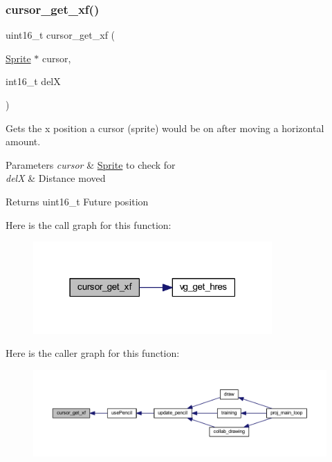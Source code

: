 \subsubsection{\texorpdfstring{cursor\+\_\+get\+\_\+xf()}{cursor\_get\_xf()}}
{\footnotesize\ttfamily uint16\+\_\+t cursor\+\_\+get\+\_\+xf (\begin{DoxyParamCaption}\item[{\mbox{\hyperlink{struct_sprite}{Sprite}} $\ast$}]{cursor,  }\item[{int16\+\_\+t}]{delX }\end{DoxyParamCaption})}



Gets the x position a cursor (sprite) would be on after moving a horizontal amount. 


\begin{DoxyParams}{Parameters}
{\em cursor} & \mbox{\hyperlink{struct_sprite}{Sprite}} to check for \\
\hline
{\em delX} & Distance moved \\
\hline
\end{DoxyParams}
\begin{DoxyReturn}{Returns}
uint16\+\_\+t Future position 
\end{DoxyReturn}
Here is the call graph for this function\+:\nopagebreak
\begin{figure}[H]
\begin{center}
\leavevmode
\includegraphics[width=259pt]{group__sprite_gae179135dc9bd1c7da4a8eb774237ec7e_cgraph}
\end{center}
\end{figure}
Here is the caller graph for this function\+:\nopagebreak
\begin{figure}[H]
\begin{center}
\leavevmode
\includegraphics[width=350pt]{group__sprite_gae179135dc9bd1c7da4a8eb774237ec7e_icgraph}
\end{center}
\end{figure}
\mbox{\label{group__sprite_gabfdb11ab1c80b5083fd8b64320139924}} 
